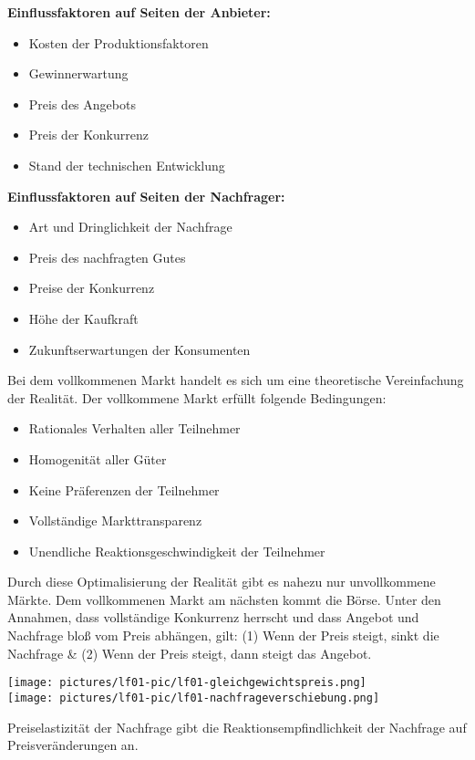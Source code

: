 {\bf Einflussfaktoren auf Seiten der Anbieter:}
\begin{itemize}
	\item Kosten der Produktionsfaktoren
	\item Gewinnerwartung
	\item Preis des Angebots
	\item Preis der Konkurrenz
	\item Stand der technischen Entwicklung
\end{itemize}

{\bf Einflussfaktoren auf Seiten der Nachfrager:}
\begin{itemize}
	\item Art und Dringlichkeit der Nachfrage
	\item Preis des nachfragten Gutes
	\item Preise der Konkurrenz
	\item Höhe der Kaufkraft
	\item Zukunftserwartungen der Konsumenten
\end{itemize}

Bei dem vollkommenen Markt handelt es sich um eine theoretische Vereinfachung der Realität. Der vollkommene Markt erfüllt folgende Bedingungen:

\begin{itemize}
	\item Rationales Verhalten aller Teilnehmer
	\item Homogenität aller Güter
	\item Keine Präferenzen der Teilnehmer
	\item Vollständige Markttransparenz
	\item Unendliche Reaktionsgeschwindigkeit der Teilnehmer
\end{itemize}

Durch diese Optimalisierung der Realität gibt es nahezu nur unvollkommene Märkte. Dem vollkommenen Markt am nächsten kommt die Börse. Unter den Annahmen, dass vollständige Konkurrenz herrscht und dass Angebot und Nachfrage bloß vom Preis abhängen, gilt: (1) Wenn der Preis steigt, sinkt die Nachfrage \& (2) Wenn der Preis steigt, dann steigt das Angebot.

\texttt{[image: pictures/lf01-pic/lf01-gleichgewichtspreis.png]}\\
\texttt{[image: pictures/lf01-pic/lf01-nachfrageverschiebung.png]}

\noindent Preiselastizität der Nachfrage gibt die Reaktionsempfindlichkeit der Nachfrage auf Preisveränderungen an.

